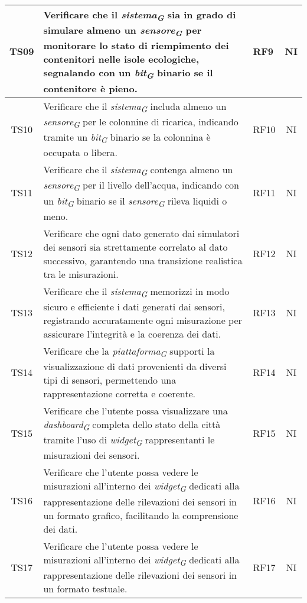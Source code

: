 \begin{longtable}{|c|p{5cm}|>{\raggedright}p{2cm}|c|}
        \hline
        TS09 & Verificare che il \textit{sistema}\textsubscript{\textit{G}} sia in grado di simulare almeno un \textit{sensore}\textsubscript{\textit{G}} per monitorare lo stato di riempimento dei contenitori nelle isole ecologiche, segnalando con un \textit{bit}\textsubscript{\textit{G}} binario se il contenitore è pieno. & RF9 & NI \\
        \hline
        TS10 & Verificare che il \textit{sistema}\textsubscript{\textit{G}} includa almeno un \textit{sensore}\textsubscript{\textit{G}} per le colonnine di ricarica, indicando tramite un \textit{bit}\textsubscript{\textit{G}} binario se la colonnina è occupata o libera. & RF10 & NI \\
        \hline
        TS11 & Verificare che il \textit{sistema}\textsubscript{\textit{G}} contenga almeno un \textit{sensore}\textsubscript{\textit{G}} per il livello dell'acqua, indicando con un \textit{bit}\textsubscript{\textit{G}} binario se il \textit{sensore}\textsubscript{\textit{G}} rileva liquidi o meno. & RF11 & NI \\
        \hline
        TS12 & Verificare che ogni dato generato dai simulatori dei sensori sia strettamente correlato al dato successivo, garantendo una transizione realistica tra le misurazioni. & RF12 & NI \\
        \hline
        TS13 & Verificare che il \textit{sistema}\textsubscript{\textit{G}} memorizzi in modo sicuro e efficiente i dati generati dai sensori, registrando accuratamente ogni misurazione per assicurare l'integrità e la coerenza dei dati. & RF13 & NI \\
        \hline
        TS14 & Verificare che la \textit{piattaforma}\textsubscript{\textit{G}} supporti la visualizzazione di dati provenienti da diversi tipi di sensori, permettendo una rappresentazione corretta e coerente. & RF14 & NI \\
        \hline
        TS15 & Verificare che l'utente possa visualizzare una \textit{dashboard}\textsubscript{\textit{G}} completa dello stato della città tramite l'uso di \textit{widget}\textsubscript{\textit{G}} rappresentanti le misurazioni dei sensori. & RF15 & NI \\
        \hline
        TS16 & Verificare che l'utente possa vedere le misurazioni all'interno dei \textit{widget}\textsubscript{\textit{G}} dedicati alla rappresentazione delle rilevazioni dei sensori in un formato grafico, facilitando la comprensione dei dati. & RF16 & NI \\
        \hline
        TS17 & Verificare che l'utente possa vedere le misurazioni all'interno dei \textit{widget}\textsubscript{\textit{G}} dedicati alla rappresentazione delle rilevazioni dei sensori in un formato testuale. & RF17 & NI \\

\end{longtable}

